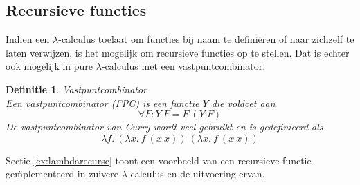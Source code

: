 \documentclass[a4paper]{article}
\newtheorem{tdefinitie}{Definitie}[section]
\newenvironment{definitie}[1]%
  {\begin{mdframed}[backgroundcolor=silver,
    topline=false,
    rightline=false,
    leftline=false,
    bottomline=false]\begin{tdefinitie}#1\\\normalfont}%
  {\end{tdefinitie}\end{mdframed}}
\begin{document}
\subsection{Recursieve functies}

Indien een $\lambda$-calculus toelaat om functies bij naam te defini\"eren of naar zichzelf te laten verwijzen, is het mogelijk om recursieve functies op te stellen. Dat is echter ook mogelijk in pure $\lambda$-calculus met een vastpuntcombinator.

\begin{definitie}{Vastpuntcombinator}
  Een vastpuntcombinator (FPC) is een functie $Y$ die voldoet aan
  \begin{equation*}
  \forall F: Y\ F = F\ (Y\ F)
  \end{equation*}
  De vastpuntcombinator van Curry wordt veel gebruikt en is gedefinieerd als
  \begin{equation*}
  \lambda f.\ (\lambda x.\ f\ (x\ x))\ (\lambda x.\ f\ (x\ x))
  \end{equation*}
\end{definitie}

Sectie \ref{ex:lambdarecurse} toont een voorbeeld van een recursieve functie ge\"mplementeerd in zuivere $\lambda$-calculus en de uitvoering ervan.




\end{document}
